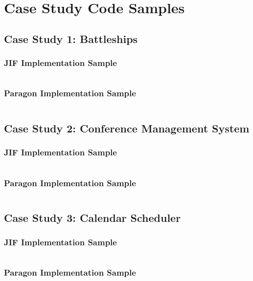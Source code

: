\appendix

\chapter{Case Study Code Samples}

\clearpage

\section{Case Study 1: Battleships}

\subsection{JIF Implementation Sample}

\inputminted{java}{content/code_sections/case_studies/bs_printout.jif}

\clearpage

\subsection{Paragon Implementation Sample}

\inputminted{java}{content/code_sections/case_studies/bs_printout.para}

\clearpage

\section{Case Study 2: Conference Management System}

\subsection{JIF Implementation Sample}

\inputminted{java}{content/code_sections/case_studies/conf_printout.jif}

\clearpage

\subsection{Paragon Implementation Sample}

\inputminted{java}{content/code_sections/case_studies/conf_printout.para}

\clearpage

\section{Case Study 3: Calendar Scheduler}

\subsection{JIF Implementation Sample}

\inputminted{java}{content/code_sections/case_studies/csched_printout.jif}

\clearpage

\subsection{Paragon Implementation Sample}

\inputminted{java}{content/code_sections/case_studies/csched_printout.para}